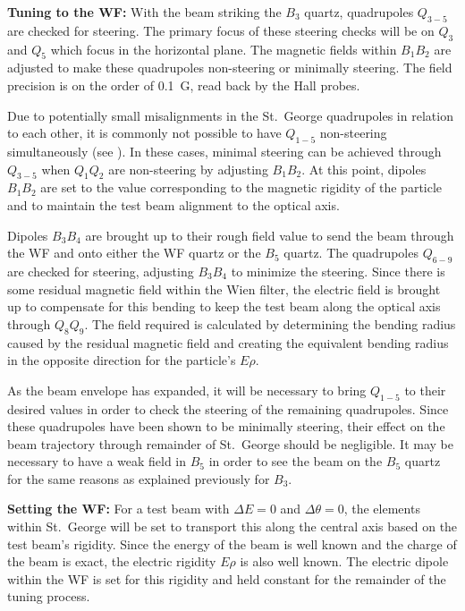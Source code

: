 \textbf{Tuning to the WF:}
With the beam striking the $B_3$ quartz, quadrupoles $Q_{3-5}$ are
checked for steering. The primary focus of these steering checks will be
on $Q_3$ and $Q_5$ which focus in the horizontal plane. The magnetic
fields within $B_1B_2$ are adjusted to make these quadrupoles
non-steering or minimally steering. The field precision is on the order
of 0.1~G, read back by the Hall probes.

Due to potentially small misalignments in the St.\ George quadrupoles in
relation to each other, it is commonly not possible to have $Q_{1-5}$
non-steering simultaneously (see \cite{Meisel2017}). In these cases,
minimal steering can be achieved through $Q_{3-5}$ when $Q_1Q_2$ are
non-steering by adjusting $B_1B_2$. At this point, dipoles $B_1B_2$ are
set to the value corresponding to the magnetic rigidity of the particle
and to maintain the test beam alignment to the optical axis.

Dipoles $B_3B_4$ are brought up to their rough field value to send the
beam through the WF and onto either the WF quartz or the $B_5$ quartz.
The quadrupoles $Q_{6-9}$ are checked for steering, adjusting $B_3B_4$
to minimize the steering. Since there is some residual magnetic field
within the Wien filter, the electric field is brought up to compensate
for this bending to keep the test beam along the optical axis through
$Q_8Q_9$. The field required is calculated by determining the bending
radius caused by the residual magnetic field and creating the equivalent
bending radius in the opposite direction for the particle's $E\rho$.

As the beam envelope has expanded, it will be necessary to bring
$Q_{1-5}$ to their desired values in order to check the steering of the
remaining quadrupoles. Since these quadrupoles have been shown to be
minimally steering, their effect on the beam trajectory through
remainder of St.\ George should be negligible. It may be necessary to
have a weak field in $B_5$ in order to see the beam on the $B_5$ quartz
for the same reasons as explained previously for $B_3$.

\textbf{Setting the WF:}
For a test beam with $\Delta E = 0$ and $\Delta\theta = 0$, the elements
within St.\ George will be set to transport this along the central axis
based on the test beam's rigidity. Since the energy of the beam is well
known and the charge of the beam is exact, the electric rigidity $E\rho$
is also well known. The electric dipole within the WF is set for this
rigidity and held constant for the remainder of the tuning process.

